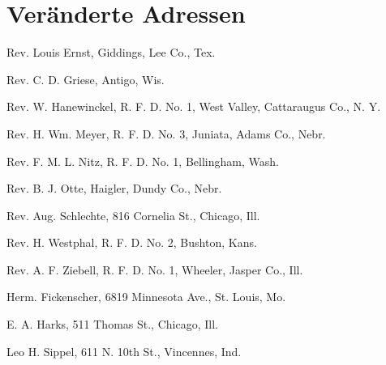 \chapter{Veränderte Adressen}


Rev. Louis Ernst, Giddings, Lee Co., Tex.

Rev. C. D. Griese, Antigo, Wis.

Rev. W. Hanewinckel,   R. F. D. No. 1, West Valley, Cattaraugus Co., N. Y.

Rev. H. Wm. Meyer, R. F. D. No. 3, Juniata, Adams Co., Nebr.

Rev. F. M. L. Nitz, R. F. D. No. 1, Bellingham, Wash.

Rev. B. J. Otte, Haigler, Dundy Co., Nebr.

Rev. Aug. Schlechte, 816 Cornelia St., Chicago, Ill.

Rev. H. Westphal, R. F. D. No. 2, Bushton, Kans.

Rev. A. F. Ziebell, R. F. D. No. 1, Wheeler, Jasper Co., Ill.

Herm. Fickenscher, 6819 Minnesota Ave., St. Louis, Mo.

E. A. Harks, 511 Thomas St., Chicago, Ill.

Leo H. Sippel, 611 N. 10th St., Vincennes, Ind.
